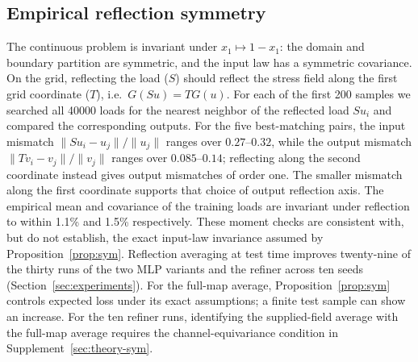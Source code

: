 \subsection{Empirical reflection symmetry}
\label{sec:symcheck}
The continuous problem is invariant under $x_1\mapsto1-x_1$: the domain and
boundary partition are symmetric, and the input law has a symmetric
covariance. On the grid, reflecting the load ($S$) should reflect the stress
field along the first grid coordinate ($T$), i.e.\ $G(Su)=TG(u)$. For each of the first 200 samples we
searched all 40000 loads for the nearest neighbor of the reflected load $Su_i$
and compared the corresponding outputs. For the five best-matching pairs, the
input mismatch $\|Su_i-u_j\|/\|u_j\|$ ranges over $0.27$--$0.32$, while the
output mismatch $\|Tv_i-v_j\|/\|v_j\|$ ranges over $0.085$--$0.14$; reflecting
along the second coordinate instead gives output mismatches of order one.
The smaller mismatch along the first coordinate supports that choice of
output reflection axis. The empirical mean and covariance of the training loads are
invariant under reflection to within 1.1\% and 1.5\% respectively. These
moment checks are consistent with, but do not establish, the exact input-law
invariance assumed by Proposition~\ref{prop:sym}. Reflection
averaging at test time improves twenty-nine of the thirty runs of the two
MLP variants and the refiner across ten seeds
(Section~\ref{sec:experiments}). For the full-map average,
Proposition~\ref{prop:sym} controls expected loss under its exact assumptions;
a finite test sample can show an increase.
For the ten refiner runs, identifying the supplied-field average with the
full-map average requires the channel-equivariance condition in
Supplement~\ref{sec:theory-sym}.
